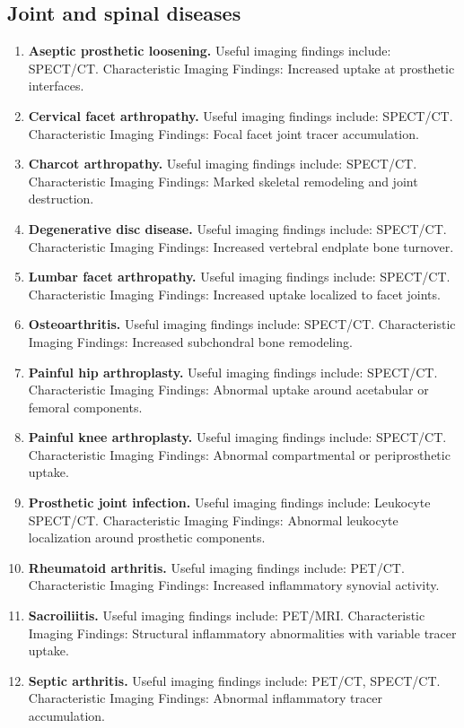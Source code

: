 \subsection{Joint and spinal diseases}
\begin{enumerate}[leftmargin=*,itemsep=0.45em,topsep=0.4em]
\item \textbf{Aseptic prosthetic loosening.} Useful imaging findings include: SPECT/CT. Characteristic Imaging Findings: Increased uptake at prosthetic interfaces.
\item \textbf{Cervical facet arthropathy.} Useful imaging findings include: SPECT/CT. Characteristic Imaging Findings: Focal facet joint tracer accumulation.
\item \textbf{Charcot arthropathy.} Useful imaging findings include: SPECT/CT. Characteristic Imaging Findings: Marked skeletal remodeling and joint destruction.
\item \textbf{Degenerative disc disease.} Useful imaging findings include: SPECT/CT. Characteristic Imaging Findings: Increased vertebral endplate bone turnover.
\item \textbf{Lumbar facet arthropathy.} Useful imaging findings include: SPECT/CT. Characteristic Imaging Findings: Increased uptake localized to facet joints.
\item \textbf{Osteoarthritis.} Useful imaging findings include: SPECT/CT. Characteristic Imaging Findings: Increased subchondral bone remodeling.
\item \textbf{Painful hip arthroplasty.} Useful imaging findings include: SPECT/CT. Characteristic Imaging Findings: Abnormal uptake around acetabular or femoral components.
\item \textbf{Painful knee arthroplasty.} Useful imaging findings include: SPECT/CT. Characteristic Imaging Findings: Abnormal compartmental or periprosthetic uptake.
\item \textbf{Prosthetic joint infection.} Useful imaging findings include: Leukocyte SPECT/CT. Characteristic Imaging Findings: Abnormal leukocyte localization around prosthetic components.
\item \textbf{Rheumatoid arthritis.} Useful imaging findings include: PET/CT. Characteristic Imaging Findings: Increased inflammatory synovial activity.
\item \textbf{Sacroiliitis.} Useful imaging findings include: PET/MRI. Characteristic Imaging Findings: Structural inflammatory abnormalities with variable tracer uptake.
\item \textbf{Septic arthritis.} Useful imaging findings include: PET/CT, SPECT/CT. Characteristic Imaging Findings: Abnormal inflammatory tracer accumulation.

\end{enumerate}
